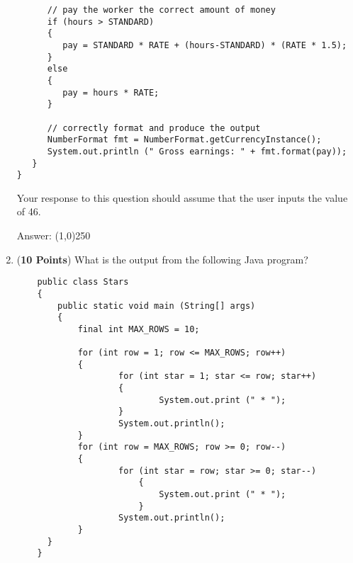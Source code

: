 \documentclass[12pt]{article}
\begin{document}
\begin{enumerate}
\begin{minipage}{6in}
\begin{lstlisting}
      // pay the worker the correct amount of money
      if (hours > STANDARD) 
      {
         pay = STANDARD * RATE + (hours-STANDARD) * (RATE * 1.5);
      }
      else 
      {
         pay = hours * RATE;
      }

      // correctly format and produce the output
      NumberFormat fmt = NumberFormat.getCurrencyInstance();
      System.out.println (" Gross earnings: " + fmt.format(pay));
   }
}
  \end{lstlisting}

\end{minipage}

Your response to this question should assume that the user inputs the value of 46.

Answer: \line(1,0){250}

\item ({\bf 10 Points}) What is the output from the following Java program?

\hspace*{.25in}
\begin{minipage}{6in}
  \lstset{numbers=left}
  \begin{lstlisting}
    public class Stars
    {
     	public static void main (String[] args)
        {
            final int MAX_ROWS = 10;

            for (int row = 1; row <= MAX_ROWS; row++)
            {
                    for (int star = 1; star <= row; star++)
                    {
                            System.out.print (" * ");
                    }
                    System.out.println();
            }
            for (int row = MAX_ROWS; row >= 0; row--)
            {
                    for (int star = row; star >= 0; star--)
                        {
                            System.out.print (" * ");
                        }
                    System.out.println();
            }
      }
    }
  \end{lstlisting}

\end{minipage}


\end{enumerate}
\end{document}
